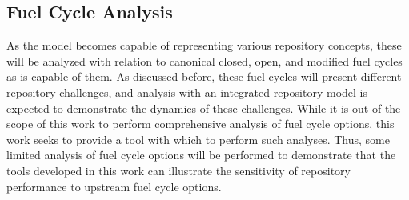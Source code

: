 \subsection{Fuel Cycle Analysis}

As the model becomes capable of representing various repository concepts, these will  
be analyzed with relation to canonical closed, open, and modified fuel cycles as  
\Cyclus is capable of them. As discussed before, these fuel cycles will present 
different repository challenges, and analysis with an integrated repository 
model is expected to demonstrate the dynamics of these challenges. While it is 
out of the scope of this work to perform comprehensive analysis of fuel cycle 
options, this work seeks to provide a tool with which to perform such analyses. 
Thus, some limited analysis of fuel cycle options will be performed to demonstrate 
that the tools developed in this work can illustrate the sensitivity of repository 
performance to upstream fuel cycle options.



